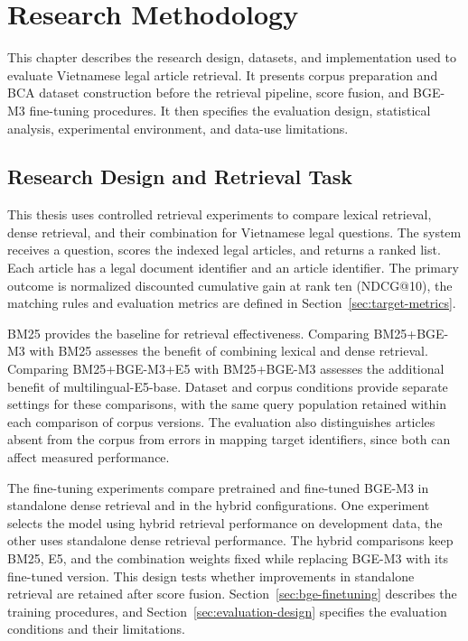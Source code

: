 \chapter{Research Methodology}

This chapter describes the research design, datasets, and implementation used to evaluate Vietnamese legal article retrieval. It presents corpus preparation and BCA dataset construction before the retrieval pipeline, score fusion, and BGE-M3 fine-tuning procedures. It then specifies the evaluation design, statistical analysis, experimental environment, and data-use limitations.

\section{Research Design and Retrieval Task}
\label{sec:research-design}

This thesis uses controlled retrieval experiments to compare lexical retrieval, dense retrieval, and their combination for Vietnamese legal questions. The system receives a question, scores the indexed legal articles, and returns a ranked list. Each article has a legal document identifier and an article identifier. The primary outcome is normalized discounted cumulative gain at rank ten (NDCG@10), the matching rules and evaluation metrics are defined in Section~\ref{sec:target-metrics}.

BM25 provides the baseline for retrieval effectiveness. Comparing BM25+BGE-M3 with BM25 assesses the benefit of combining lexical and dense retrieval. Comparing BM25+BGE-M3+E5 with BM25+BGE-M3 assesses the additional benefit of multilingual-E5-base. Dataset and corpus conditions provide separate settings for these comparisons, with the same query population retained within each comparison of corpus versions. The evaluation also distinguishes articles absent from the corpus from errors in mapping target identifiers, since both can affect measured performance.

The fine-tuning experiments compare pretrained and fine-tuned BGE-M3 in standalone dense retrieval and in the hybrid configurations. One experiment selects the model using hybrid retrieval performance on development data, the other uses standalone dense retrieval performance. The hybrid comparisons keep BM25, E5, and the combination weights fixed while replacing BGE-M3 with its fine-tuned version. This design tests whether improvements in standalone retrieval are retained after score fusion. Section~\ref{sec:bge-finetuning} describes the training procedures, and Section~\ref{sec:evaluation-design} specifies the evaluation conditions and their limitations.

